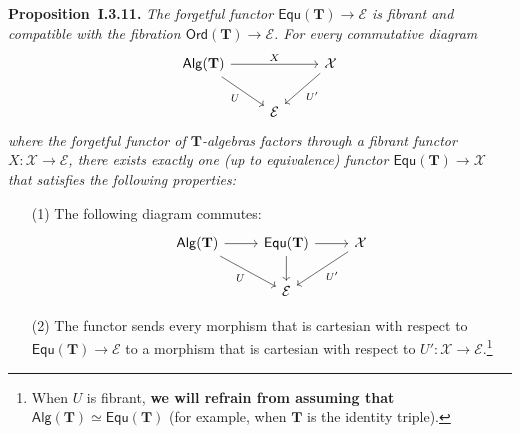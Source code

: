 \documentclass[fleqn]{article}
\newenvironment{itenv}[1]
  {\phantomsection\par\medskip\noindent\textbf{#1.}\itshape}
  {\par\medskip}
\newcommand{\unsure}[1]{{\color{purple}\textbf{#1}}}
\newcommand{\TT}{\mathbf{T}}
\newcommand{\cat}[1]{\mathcal{#1}}
\newcommand{\Cat}[1]{\mathsf{#1}}
\newcommand{\Alg}[1]{\Cat{Alg}(#1)}
\newcommand{\Ord}[1]{\Cat{Ord}(#1)}
\newcommand{\Equ}[1]{\Cat{Equ}(#1)}
\begin{document}
\begin{itenv}{Proposition~I.3.11}
  The forgetful functor $\Equ{\TT}\to\cat{E}$ is fibrant and compatible with the fibration $\Ord{\TT}\to\cat{E}$.
  For every commutative diagram
  \[
    \begin{tikzcd}
      \Alg{\TT}
        \ar[rr,"X"]
        \ar[dr,swap,"U"]
    &&\cat{X}
        \ar[dl,"U'"]
    \\&\cat{E}
    \end{tikzcd}
  \]
  where the forgetful functor of $\TT$-algebras factors through a fibrant functor $X\colon\cat{X}\to\cat{E}$, there exists exactly one (up to equivalence) functor $\Equ{\TT}\to\cat{X}$ that satisfies the following properties:
  \begin{enumerate}
    \item[(1)] The following diagram commutes:
      \[
        \begin{tikzcd}
          \Alg{\TT}
            \ar[r]
            \ar[dr,swap,"U"]
        & \Equ{\TT}
            \ar[r]
            \ar[d]
        & \cat{X}
            \ar[dl,"U'"]
        \\&\cat{E}
        \end{tikzcd}
      \]

    \item[(2)] The functor sends every morphism that is cartesian with respect to $\Equ{\TT}\to\cat{E}$ to a morphism that is cartesian with respect to $U'\colon\cat{X}\to\cat{E}$.\footnote{When $U$ is fibrant, \unsure{we will refrain from assuming that $\Alg{\TT}\simeq\Equ{\TT}$} (for example, when $\TT$ is the identity triple).}
  \end{enumerate}
\end{itenv}
\end{document}
